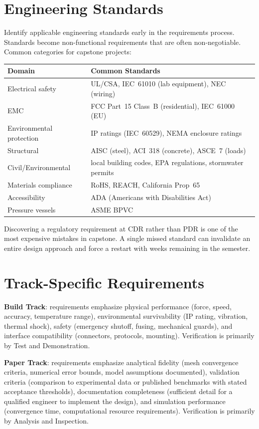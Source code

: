 \section{Engineering Standards}
Identify applicable engineering standards early in the requirements process. Standards become non-functional requirements that are often non-negotiable. Common categories for capstone projects:

\begin{center}\small
\begin{tabularx}{\textwidth}{lX}
\toprule
\textbf{Domain} & \textbf{Common Standards} \\
\midrule
Electrical safety & UL/CSA, IEC~61010 (lab equipment), NEC (wiring) \\
EMC & FCC Part~15 Class~B (residential), IEC~61000 (EU) \\
Environmental protection & IP ratings (IEC~60529), NEMA enclosure ratings \\
Structural & AISC (steel), ACI~318 (concrete), ASCE~7 (loads) \\
Civil/Environmental & local building codes, EPA regulations, stormwater permits \\
Materials compliance & RoHS, REACH, California Prop~65 \\
Accessibility & ADA (Americans with Disabilities Act) \\
Pressure vessels & ASME BPVC \\
\bottomrule
\end{tabularx}
\end{center}

Discovering a regulatory requirement at CDR rather than PDR is one of the most expensive mistakes in capstone. A single missed standard can invalidate an entire design approach and force a restart with weeks remaining in the semester.

\section{Track-Specific Requirements}

\textbf{Build Track}: requirements emphasize physical performance (force, speed, accuracy, temperature range), environmental survivability (IP rating, vibration, thermal shock), safety (emergency shutoff, fusing, mechanical guards), and interface compatibility (connectors, protocols, mounting). Verification is primarily by Test and Demonstration.

\textbf{Paper Track}: requirements emphasize analytical fidelity (mesh convergence criteria, numerical error bounds, model assumptions documented), validation criteria (comparison to experimental data or published benchmarks with stated acceptance thresholds), documentation completeness (sufficient detail for a qualified engineer to implement the design), and simulation performance (convergence time, computational resource requirements). Verification is primarily by Analysis and Inspection.

